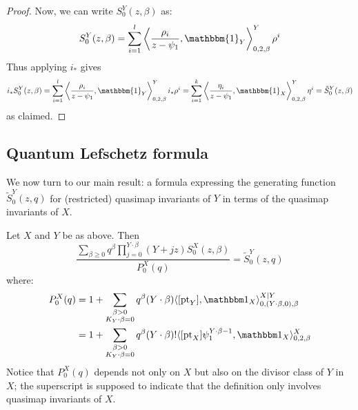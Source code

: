 \begin{proof}
Now, we can write $S_0^Y(z,\beta)$ as:
\begin{equation*} S_0^Y(z,\beta) = \sum_{i=1}^l \left\langle \dfrac{\rho_i}{z-\psi_1} , \mathbbm{1}_Y \right\rangle_{0,2,\beta}^Y  \rho^i \end{equation*}
Thus applying $i_*$ gives
\begin{align*} i_* S_0^Y(z,\beta)  = \sum_{i=1}^l \left\langle \dfrac{\rho_i}{z-\psi_1} , \mathbbm{1}_Y \right\rangle_{0,2,\beta}^Y   i_* \rho^i
= \sum_{i=1}^k \left\langle \dfrac{\eta_i}{z-\psi_1}, \mathbbm{1}_X \right\rangle_{0,2,\beta}^Y   \eta^i = \tilde{S}_0^Y(z,\beta) \end{align*}
as claimed. \end{proof}


\subsection{Quantum Lefschetz formula} We now turn to our main result: a formula expressing the generating function $\tilde{S}_0^Y(z,q)$ for (restricted) quasimap invariants of $Y$ in terms of the quasimap invariants of $X$.

\begin{thm} \label{Theorem Quantum Lefschetz}
Let $X$ and $Y$ be as above. Then
\begin{equation}\label{eqn:mirror}
\dfrac{\sum_{\beta\geq 0} q^\beta\prod_{j=0}^{Y\cdot\beta}(Y+jz)S_0^X(z,\beta)}{P_0^X(q)}= \tilde{S}_0^Y(z,q)
\end{equation}
where:
\begin{align*}
 P_0^X(q) & = 1 + \sum_{\substack{\beta>0 \\ K_Y\cdot\beta=0}} q^\beta (Y\cdot\beta) \langle [\pt_Y],\mathbbm 1_{X}\rangle_{0,(Y\cdot\beta,0),\beta}^{X|Y} \\
& = 1 + \sum_{\substack{\beta>0 \\ K_Y\cdot\beta=0}} q^\beta(Y\cdot\beta)!\langle [\pt_X] \psi_1^{Y\cdot\beta-1} ,\mathbbm 1_{X}\rangle_{0,2,\beta}^X
\end{align*}
Notice that $P_0^X(q)$ depends not only on $X$ but also on the divisor class of $Y$ in $X$; the superscript is supposed to indicate that the definition only involves quasimap invariants of $X$.
\end{thm}

